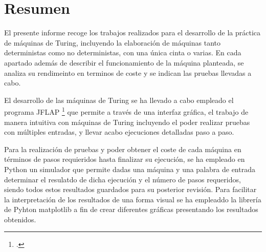 \part{Resumen}

El presente informe recoge los trabajos realizados para el desarrollo de la práctica de máquinas de Turing, incluyendo la elaboración de máquinas tanto deterministas como no deterministas, con una única cinta o varias. En cada apartado además de describir el funcionamiento de la máquina planteada, se analiza su rendimeinto en terminos de coste y se indican las pruebas llevadas a cabo.\medskip

El desarrollo de las máquinas de Turing se ha llevado a cabo empleado el programa JFLAP \footcite{jflap} que permite a través de una interfaz gráfica, el trabajo de manera intuitiva con máquinas de Turing incluyendo el poder realizar pruebas con múltiples entradas, y llevar acabo ejecuciones detalladas paso a paso.\medskip

Para la realización de pruebas y poder obtener el coste de cada máquina en términos de pasos requieridos hasta finalizar su ejecución, se ha empleado en Python un simulador que permite dadas una máquina y una palabra de entrada determinar el resulatdo de dicha ejecución y el número de pasos requeridos, siendo todos estos resultados guardados para su posterior revisión. Para facilitar la interpretación de los resultados de una forma visual se ha empleaddo la librería de Pyhton matplotlib\supercite{matplotlib} a fin de crear diferentes gráficas presentando los resultados obtenidos.
